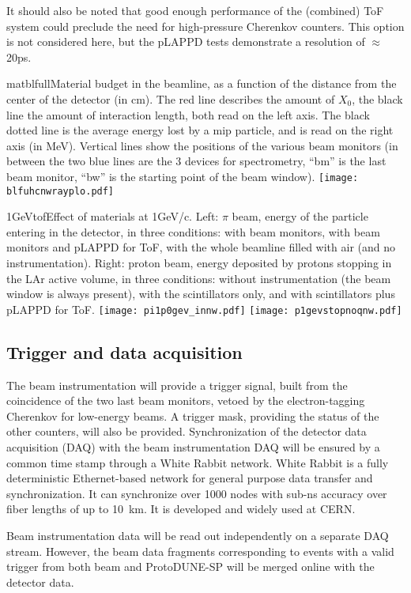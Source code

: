 It should also be noted that good enough performance of the (combined) ToF system could preclude the need for high-pressure  Cherenkov counters. 
This option is not considered here, but %
 the pLAPPD tests demonstrate a resolution of $\approx$20ps.

  \begin{cdrfigure}{matblfull}{Material budget in the beamline, as a function of the distance from the center of the detector (in cm). The red line describes the amount of $X_0$, the black line the amount of interaction length, both read on the left axis. The black dotted line is the average energy lost by a mip particle, and is read on the right axis (in MeV). Vertical lines show the positions of the various beam monitors (in between the two blue lines are the 3 devices for spectrometry, ``bm'' is the last beam monitor, ``bw'' is the starting point of the beam window).}  
\texttt{[image: blfuhcnwrayplo.pdf]}
\end{cdrfigure}
%
 \begin{cdrfigure}{1GeVtof}{Effect of materials at  1GeV/c. Left: $\pi$ beam, energy of the particle entering in the detector, in three conditions: with  beam monitors, with beam monitors and pLAPPD for ToF, with the whole beamline filled with air (and no instrumentation). Right: proton beam, energy deposited by protons stopping in the LAr active volume, in three conditions: without instrumentation (the beam window is always present), with the scintillators only, and with scintillators plus pLAPPD for ToF.}
\texttt{[image: pi1p0gev\_innw.pdf]}
\texttt{[image: p1gevstopnoqnw.pdf]}
\end{cdrfigure}



\subsection {Trigger and data acquisition}

The beam instrumentation will provide a trigger signal, built from the coincidence of the two last beam monitors, vetoed by the electron-tagging Cherenkov for low-energy beams. 
A trigger mask, providing the status of the other counters, will also be provided. 
 Synchronization of the detector data acquisition (DAQ) with the beam instrumentation DAQ will be ensured by a common time stamp through a White Rabbit network.
 White Rabbit is a fully deterministic Ethernet-based network for general purpose data transfer and synchronization. It can synchronize over 1000 nodes with sub-ns accuracy over fiber lengths of up to 10~km. It is developed and widely used at CERN.  

Beam instrumentation data will be read out independently on a separate DAQ stream. However,  
the beam data fragments corresponding to  events with a valid trigger from both beam and ProtoDUNE-SP will be merged online with the detector data.
 
